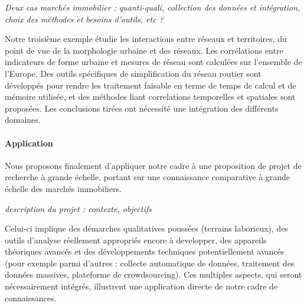 \documentclass[11pt]{article}
\begin{document}
\textit{Deux cas marchés immobilier : quanti-quali, collection des données et intégration, choix des méthodes et besoins d'outils, etc ?}

Notre troisième exemple étudie les interactions entre réseaux et territoires, du point de vue de la morphologie urbaine et des réseaux. Les corrélations entre indicateurs de forme urbaine et mesures de réseau sont calculées sur l'ensemble de l'Europe. Des outils spécifiques de simplification du réseau routier sont développés pour rendre les traitement faisable en terme de temps de calcul et de mémoire utilisée, et des méthodes liant correlations temporelles et spatiales sont proposées. Les conclusions tirées ont nécessité une intégration des différents domaines.


\paragraph{Application}

Nous proposons finalement d'appliquer notre cadre à une proposition de projet de recherche à grande échelle, portant sur une connaissance comparative à grande échelle des marchés immobiliers. 

\textit{description du projet : contexte, objectifs}

Celui-ci implique des démarches qualitatives poussées (terrains laborieux), des outils d'analyse réellement appropriés encore à developper, des appareils théoriques avancés et des développements techniques potentiellement avancés (pour exemple parmi d'autres : collecte automatique de données, traitement des données massives, plateforme de crowdsourcing). Ces multiples aspects, qui seront nécessairement intégrés, illustrent une application directe de notre cadre de connaissances.















\end{document}
